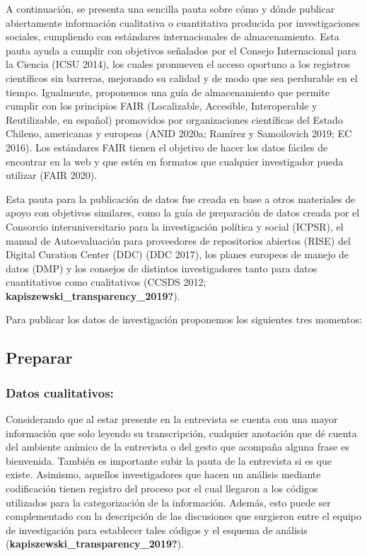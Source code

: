 \documentclass[
  spanish,
  letterpaper,
  DIV=11,
  numbers=noendperiod]{scrreprt}
\begin{document}
A continuación, se presenta una sencilla pauta sobre cómo y dónde
publicar abiertamente información cualitativa o cuantitativa producida
por investigaciones sociales, cumpliendo con estándares internacionales
de almacenamiento. Esta pauta ayuda a cumplir con objetivos señalados
por el Consejo Internacional para la Ciencia (ICSU 2014), los cuales
promueven el acceso oportuno a los registros científicos sin barreras,
mejorando su calidad y de modo que sea perdurable en el tiempo.
Igualmente, proponemos una guía de almacenamiento que permite cumplir
con los principios FAIR (Localizable, Accesible, Interoperable y
Reutilizable, en español) promovidos por organizaciones científicas del
Estado Chileno, americanas y europeas (ANID 2020a; Ramírez y Samoilovich
2019; EC 2016). Los estándares FAIR tienen el objetivo de hacer los
datos fáciles de encontrar en la web y que estén en formatos que
cualquier investigador pueda utilizar (FAIR 2020).

Esta pauta para la publicación de datos fue creada en base a otros
materiales de apoyo con objetivos similares, como la guía de preparación
de datos creada por el Consorcio interuniversitario para la
investigación política y social (ICPSR), el manual de Autoevaluación
para proveedores de repositorios abiertos (RISE) del Digital Curation
Center (DDC) (DDC 2017), los planes europeos de manejo de datos (DMP) y
los consejos de distintos investigadores tanto para datos cuantitativos
como cualitativos (CCSDS 2012;
\textbf{kapiszewski\_transparency\_2019?}).

Para publicar los datos de investigación proponemos los siguientes tres
momentos:

\subsection{Preparar}\label{preparar}

\subsubsection{Datos cualitativos:}\label{datos-cualitativos}

Considerando que al estar presente en la entrevista se cuenta con una
mayor información que solo leyendo su transcripción, cualquier anotación
que dé cuenta del ambiente anímico de la entrevista o del gesto que
acompaña alguna frase es bienvenida. También es importante subir la
pauta de la entrevista si es que existe. Asimismo, aquellos
investigadores que hacen un análisis mediante codificación tienen
registro del proceso por el cual llegaron a los códigos utilizados para
la categorización de la información. Además, esto puede ser
complementado con la descripción de las discusiones que surgieron entre
el equipo de investigación para establecer tales códigos y el esquema de
análisis (\textbf{kapiszewski\_transparency\_2019?}).
\end{document}
